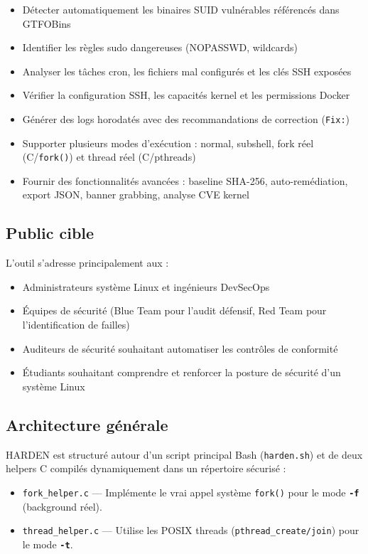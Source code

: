 \documentclass[12pt,a4paper]{article}
\newcommand{\opt}[1]{\texttt{\textcolor{bleuMed}{\textbf{#1}}}}
\newcommand{\cmd}[1]{\texttt{\textcolor{codeText}{#1}}}
\newcommand{\fichier}[1]{\texttt{\textcolor{bleuENSET}{#1}}}
\begin{document}
\begin{itemize}[topsep=2pt, itemsep=2pt]
  \item Détecter automatiquement les binaires SUID vulnérables référencés dans GTFOBins
  \item Identifier les règles sudo dangereuses (NOPASSWD, wildcards)
  \item Analyser les tâches cron, les fichiers mal configurés et les clés SSH exposées
  \item Vérifier la configuration SSH, les capacités kernel et les permissions Docker
  \item Générer des logs horodatés avec des recommandations de correction (\cmd{Fix:})
  \item Supporter plusieurs modes d'exécution : normal, subshell, fork réel (C/\cmd{fork()}) et thread réel (C/pthreads)
  \item Fournir des fonctionnalités avancées : baseline SHA-256, auto-remédiation, export JSON, banner grabbing, analyse CVE kernel
\end{itemize}

\subsection{Public cible}

L'outil s'adresse principalement aux :
\begin{itemize}[topsep=2pt, itemsep=2pt]
  \item Administrateurs système Linux et ingénieurs DevSecOps
  \item Équipes de sécurité (Blue Team pour l'audit défensif, Red Team pour l'identification de failles)
  \item Auditeurs de sécurité souhaitant automatiser les contrôles de conformité
  \item Étudiants souhaitant comprendre et renforcer la posture de sécurité d'un système Linux
\end{itemize}

\subsection{Architecture générale}

HARDEN est structuré autour d'un script principal Bash (\fichier{harden.sh}) et de deux helpers C compilés dynamiquement dans un répertoire sécurisé :

\begin{itemize}[topsep=2pt, itemsep=2pt]
  \item \fichier{fork\_helper.c} --- Implémente le vrai appel système \cmd{fork()} pour le mode \opt{-f} (background réel).
  \item \fichier{thread\_helper.c} --- Utilise les POSIX threads (\cmd{pthread\_create/join}) pour le mode \opt{-t}.
\end{itemize}
\end{document}
